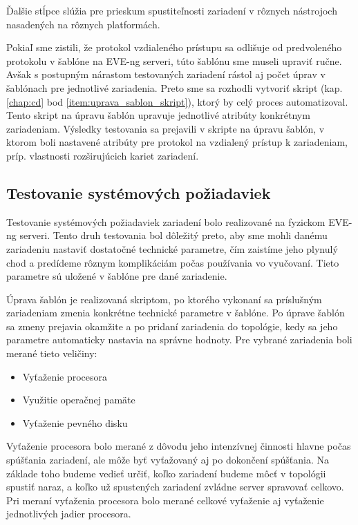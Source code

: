 Ďalšie stĺpce slúžia pre prieskum spustiteľnosti zariadení v rôznych nástrojoch nasadených na rôznych platformách.

Pokiaľ sme zistili, že protokol vzdialeného prístupu sa odlišuje od predvoleného protokolu v šablóne na EVE-ng serveri, túto šablónu sme museli upraviť ručne. Avšak s postupným nárastom testovaných zariadení rástol aj počet úprav v šablónach pre jednotlivé zariadenia. Preto sme sa rozhodli vytvoriť skript (kap. \ref{chap:cd} bod \ref{item:uprava_sablon_skript}), ktorý by celý proces automatizoval. Tento skript na úpravu šablón upravuje jednotlivé atribúty konkrétnym zariadeniam. Výsledky testovania sa prejavili v skripte na úpravu šablón, v ktorom boli nastavené atribúty pre protokol na vzdialený prístup k zariadeniam, príp. vlastnosti rozširujúcich kariet zariadení.





\subsection{Testovanie systémových požiadaviek}
\label{chap:testovanie_zariadeni_benchmark}

Testovanie systémových požiadaviek zariadení bolo realizované na fyzickom EVE-ng serveri. Tento druh testovania bol dôležitý preto, aby sme mohli danému zariadeniu nastaviť dostatočné technické parametre, čím zaistíme jeho plynulý chod a predídeme rôznym komplikáciám počas používania vo vyučovaní. Tieto parametre sú uložené v šablóne pre dané zariadenie.

Úprava šablón je realizovaná skriptom, po ktorého vykonaní sa príslušným zariadeniam zmenia konkrétne technické parametre v šablóne. Po úprave šablón sa zmeny prejavia okamžite a po pridaní zariadenia do topológie, kedy sa jeho parametre automaticky nastavia na správne hodnoty. Pre vybrané zariadenia boli merané tieto veličiny:

\begin{itemize}[noitemsep]
    \item Vyťaženie procesora
    \item Využitie operačnej pamäte
    \item Vyťaženie pevného disku
\end{itemize}

Vyťaženie procesora bolo merané z dôvodu jeho intenzívnej činnosti hlavne počas spúšťania zariadení, ale môže byť vyťažovaný aj po dokončení spúšťania. Na základe toho budeme vedieť určiť, koľko zariadení budeme môcť v topológii spustiť naraz, a koľko už spustených zariadení zvládne server spravovať celkovo. Pri meraní vyťaženia procesora bolo merané celkové vyťaženie aj vyťaženie jednotlivých jadier procesora.

